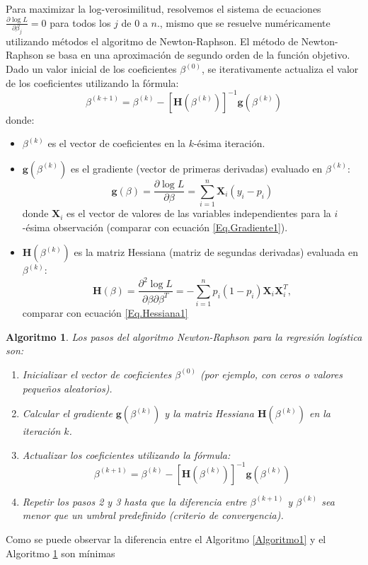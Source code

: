 \documentclass[a4paper]{report} %
\newtheorem{Algthm}{Algoritmo}[chapter]
\begin{document}
Para maximizar la log-verosimilitud, resolvemos el sistema de ecuaciones $\frac{\partial \log L}{\partial \beta_j} = 0$ para todos los $j$ de 0 a $n$., mismo que se resuelve numéricamente utilizando métodos el algoritmo de Newton-Raphson. El método de Newton-Raphson se basa en una aproximación de segundo orden de la función objetivo. Dado un valor inicial de los coeficientes $\beta^{(0)}$, se iterativamente actualiza el valor de los coeficientes utilizando la fórmula:
\begin{equation}\label{Eq.Criterio1.5}
\beta^{(k+1)} = \beta^{(k)} - \left[ \mathbf{H}(\beta^{(k)}) \right]^{-1} \mathbf{g}(\beta^{(k)})
\end{equation}
donde:
\begin{itemize}
    \item $\beta^{(k)}$ es el vector de coeficientes en la $k$-ésima iteración.
    \item $\mathbf{g}(\beta^{(k)})$ es el gradiente (vector de primeras derivadas) evaluado en $\beta^{(k)}$:
\begin{equation}\label{Eq.Gradiente2}
\mathbf{g}(\beta) = \frac{\partial \log L}{\partial \beta} = \sum_{i=1}^{n} \mathbf{X}_i (y_i - p_i)
\end{equation}
donde $\mathbf{X}_i$ es el vector de valores de las variables independientes para la $i$-ésima observación (comparar con ecuaci\'on \ref{Eq.Gradiente1}).

    \item $\mathbf{H}(\beta^{(k)})$ es la matriz Hessiana (matriz de segundas derivadas) evaluada en $\beta^{(k)}$:
\begin{equation}\label{Eq.Hessiana2}
\mathbf{H}(\beta) = \frac{\partial^2 \log L}{\partial \beta \partial \beta^T} = -\sum_{i=1}^{n} p_i (1 - p_i) \mathbf{X}_i \mathbf{X}_i^T,
\end{equation}
comparar con ecuaci\'on \ref{Eq.Hessiana1}
\end{itemize}

\begin{Algthm} \label{Algoritmo2}
Los pasos del algoritmo Newton-Raphson para la regresión logística son:
\begin{enumerate}
    \item Inicializar el vector de coeficientes $\beta^{(0)}$ (por ejemplo, con ceros o valores pequeños aleatorios).
    \item Calcular el gradiente $\mathbf{g}(\beta^{(k)})$ y la matriz Hessiana $\mathbf{H}(\beta^{(k)})$ en la iteración $k$.
    \item Actualizar los coeficientes utilizando la fórmula:
    \begin{equation}\label{Eq.Criterio2}
    \beta^{(k+1)} = \beta^{(k)} - \left[ \mathbf{H}(\beta^{(k)}) \right]^{-1} \mathbf{g}(\beta^{(k)})
    \end{equation}
    \item Repetir los pasos 2 y 3 hasta que la diferencia entre $\beta^{(k+1)}$ y $\beta^{(k)}$ sea menor que un umbral predefinido (criterio de convergencia).
\end{enumerate}
\end{Algthm}
Como se puede observar la diferencia entre el Algoritmo \ref{Algoritmo1} y el Algoritmo \ref{Algoritmo2} son m\'inimas
\end{document}
